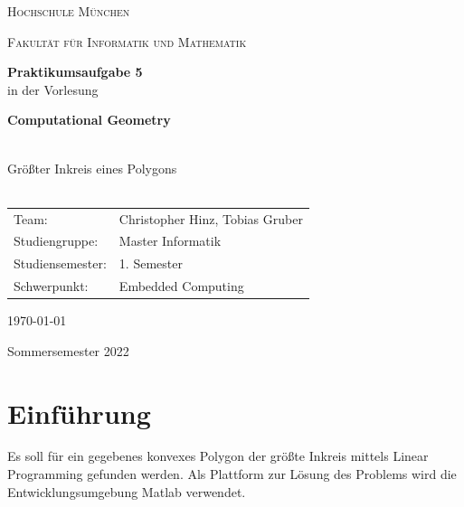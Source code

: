 \documentclass[12pt]{scrartcl}
\begin{document}
\begin{titlepage}
    \vfill
	\centering
    \vspace{1.5cm}

	{\scshape\LARGE Hochschule München \par}
    {\scshape\Large Fakultät für Informatik und Mathematik\par}
	\vspace{1.5cm}




    \vfill
    {\LARGE\bfseries Praktikumsaufgabe 5 \\}
    \vspace{0.5cm}
	{in der Vorlesung\\}
    \vspace{0.5cm}
    {\LARGE\bfseries Computational Geometry\\~\\ \par}
	{\LARGE Größter Inkreis eines Polygons\\~\\ \par}
	\vfill
    \vfill


    \begin{tabular}{ll}
    \normalsize
    Team:  & Christopher Hinz, Tobias Gruber\\
    Studiengruppe: & Master Informatik\\
    Studiensemester: & 1. Semester\\
    Schwerpunkt: & Embedded Computing\\
    \end{tabular}
    \vspace{1.5cm}

    \today

    \vspace{0.5cm}

    Sommersemester 2022

	\vfill

\end{titlepage}

\newpage

\section{Einführung}
Es soll für ein gegebenes konvexes Polygon der größte Inkreis mittels Linear Programming gefunden werden.
Als Plattform zur Lösung des Problems wird die Entwicklungsumgebung Matlab verwendet.
\end{document}
